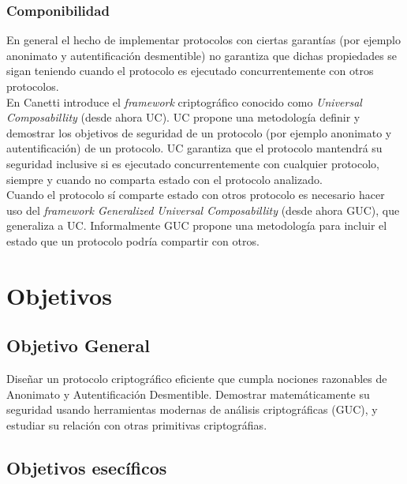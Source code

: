\subsubsection{Componibilidad}
En general el hecho de implementar protocolos con ciertas garantías (por ejemplo anonimato y
autentificación desmentible) no garantiza que dichas propiedades se sigan teniendo cuando
el protocolo es ejecutado concurrentemente con otros protocolos.\\
En \cite{conf/focs/Canetti01} Canetti introduce el \textit{framework} criptográfico conocido
como \textit{Universal Composabillity} (desde ahora UC). UC propone una metodología definir y
demostrar los objetivos de seguridad de un protocolo (por ejemplo anonimato y autentificación)
de un protocolo. UC garantiza que el protocolo mantendrá su seguridad inclusive
si es ejecutado concurrentemente con cualquier protocolo, siempre y cuando no comparta estado
con el protocolo analizado.\\
Cuando el protocolo sí comparte estado con otros protocolo es necesario hacer uso del
\textit{framework Generalized Universal Composabillity} (desde ahora GUC), que generaliza a UC.
Informalmente GUC propone una metodología para incluir el estado que un protocolo podría compartir
con otros.

\section{Objetivos}

\subsection{Objetivo General}
Diseñar un protocolo criptográfico eficiente que cumpla nociones razonables
de Anonimato y Autentificación Desmentible. Demostrar matemáticamente su
seguridad usando herramientas modernas de análisis criptográficas (GUC), y
estudiar su relación con otras primitivas criptográfias.

\subsection{Objetivos esecíficos}

